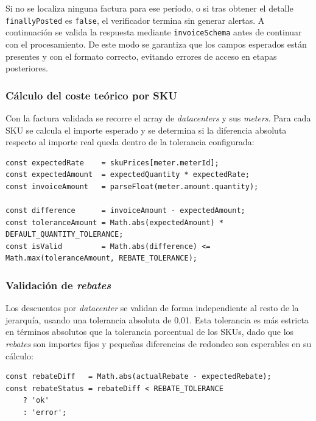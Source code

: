 Si no se localiza ninguna factura para ese período, o si tras obtener el detalle \texttt{finallyPosted} es \texttt{false}, el verificador termina sin generar alertas. A continuación se valida la respuesta mediante \texttt{invoiceSchema} antes de continuar con el procesamiento. De este modo se garantiza que los campos esperados están presentes y con el formato correcto, evitando errores de acceso en etapas posteriores.

\subsubsection{Cálculo del coste teórico por SKU}

Con la factura validada se recorre el array de \textit{datacenters} y sus \textit{meters}. Para cada SKU se calcula el importe esperado y se determina si la diferencia absoluta respecto al importe real queda dentro de la tolerancia configurada:

\begin{lstlisting}[caption=Cálculo del importe esperado y validación de la desviación, label=lst:expected-amount]
const expectedRate    = skuPrices[meter.meterId];
const expectedAmount  = expectedQuantity * expectedRate;
const invoiceAmount   = parseFloat(meter.amount.quantity);

const difference      = invoiceAmount - expectedAmount;
const toleranceAmount = Math.abs(expectedAmount) * DEFAULT_QUANTITY_TOLERANCE;
const isValid         = Math.abs(difference) <= Math.max(toleranceAmount, REBATE_TOLERANCE);
\end{lstlisting}


\subsubsection{Validación de \textit{rebates}}

Los descuentos por \textit{datacenter} se validan de forma independiente al resto de la jerarquía, usando una tolerancia absoluta de 0,01. Esta tolerancia es más estricta en términos absolutos que la tolerancia porcentual de los SKUs, dado que los \textit{rebates} son importes fijos y pequeñas diferencias de redondeo son esperables en su cálculo:

\begin{lstlisting}[caption=Validación del rebate por datacenter, label=lst:rebate]
const rebateDiff   = Math.abs(actualRebate - expectedRebate);
const rebateStatus = rebateDiff < REBATE_TOLERANCE
    ? 'ok'
    : 'error';
\end{lstlisting}

